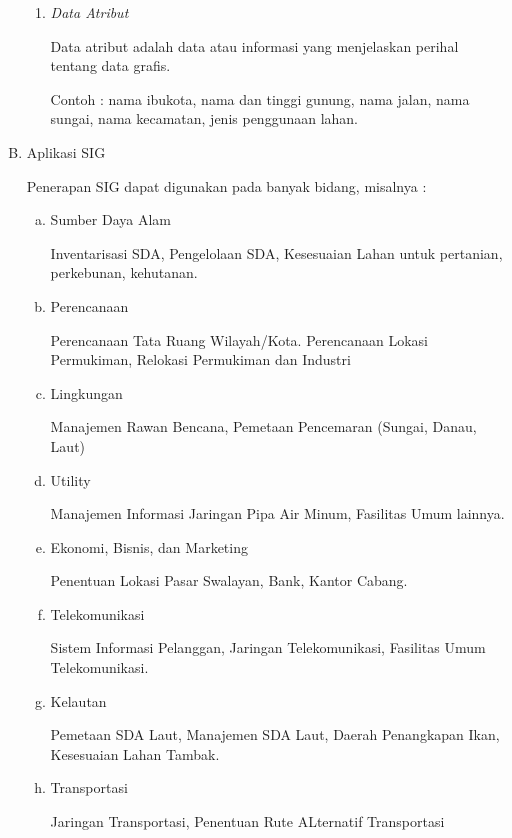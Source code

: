 \begin{enumerate}[A.]
\begin{enumerate}[\itshape 1.]
  \item \textit{Data Atribut}

  Data atribut adalah data atau informasi yang menjelaskan perihal tentang data grafis.
  
  Contoh : nama ibukota, nama dan tinggi gunung, nama jalan, nama sungai, nama kecamatan, jenis penggunaan lahan.
  
\end{enumerate}  

\item Aplikasi SIG

Penerapan SIG dapat digunakan pada banyak bidang, misalnya :

  \begin{enumerate}[(a)]
  
    \item Sumber Daya Alam

    Inventarisasi SDA, Pengelolaan SDA, Kesesuaian Lahan untuk pertanian, perkebunan, kehutanan.

    \item Perencanaan

    Perencanaan Tata Ruang Wilayah/Kota. Perencanaan Lokasi Permukiman, Relokasi Permukiman dan Industri

    \item Lingkungan

    Manajemen Rawan Bencana, Pemetaan Pencemaran (Sungai, Danau, Laut)

    \item Utility

    Manajemen Informasi Jaringan Pipa Air Minum, Fasilitas Umum lainnya.

    \item Ekonomi, Bisnis, dan Marketing
  
    Penentuan Lokasi Pasar Swalayan, Bank, Kantor Cabang.

    \item Telekomunikasi

    Sistem Informasi Pelanggan, Jaringan Telekomunikasi, Fasilitas Umum Telekomunikasi.

    \item Kelautan

    Pemetaan SDA Laut, Manajemen SDA Laut, Daerah Penangkapan Ikan, Kesesuaian Lahan Tambak.

    \item Transportasi

    Jaringan Transportasi, Penentuan Rute ALternatif Transportasi
    
  \end{enumerate}

\end{enumerate}